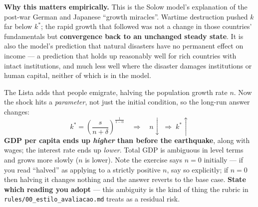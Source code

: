 \documentclass[12pt, letterpaper]{article}
\newcommand{\stst}{^{\ast}}
\begin{document}
\begin{tcolorbox}[oddbox,title={Problem 4.1 \quad An Earthquake}]
\textbf{Why this matters empirically.} This is the Solow model's explanation of the post-war
German and Japanese ``growth miracles''. Wartime destruction pushed $k$ far below $k\stst$;
the rapid growth that followed was not a change in those countries' fundamentals but
\textbf{convergence back to an unchanged steady state}. It is also the model's prediction
that natural disasters have no permanent effect on income --- a prediction that holds up
reasonably well for rich countries with intact institutions, and much less well where the
disaster damages institutions or human capital, neither of which is in the model.

\begin{tcolorbox}[theorybox,title={Extension in Lista 1: what if $n$ halves too?}]
The Lista adds that people emigrate, halving the population growth rate $n$. Now the shock
hits a \emph{parameter}, not just the initial condition, so the long-run answer changes:
$$k\stst = \left(\frac{s}{n+\delta}\right)^{\frac{1}{1-\alpha}}
\quad\Longrightarrow\quad n \downarrow \;\Rightarrow\; k\stst \uparrow$$
\textbf{GDP per capita ends up \emph{higher} than before the earthquake}, along with wages;
the interest rate ends up \emph{lower}. Total GDP is ambiguous in level terms and grows more
slowly ($n$ is lower). Note the exercise says $n=0$ initially --- if you read ``halved'' as
applying to a strictly positive $n$, say so explicitly; if $n = 0$ then halving it changes
nothing and the answer reverts to the base case. \textbf{State which reading you adopt} ---
this ambiguity is the kind of thing the rubric in \texttt{rules/00\_estilo\_avaliacao.md}
treats as a residual risk.
\end{tcolorbox}
\end{tcolorbox}
\end{document}
